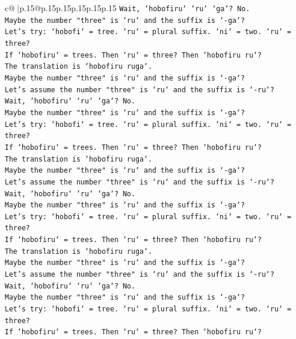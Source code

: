 \documentclass{article}
\begin{document}
{\begin{supertabular}{c@{$\;$}|p{.15\linewidth}@{}p{.15\linewidth}p{.15\linewidth}p{.15\linewidth}p{.15\linewidth}p{.15\linewidth}}
{{{\texttt{Wait, `hobofiru` `ru` `ga`? No.} \\
\texttt{Maybe the number "three" is `ru` and the suffix is `{-}ga`?} \\
\texttt{Let's try: `hobofi` = tree. `ru` = plural suffix. `ni` = two. `ru` = three?} \\
\texttt{If `hobofiru` = trees. Then `ru` = three? Then `hobofiru ru`?} \\
\texttt{The translation is `hobofiru ruga`.} \\
\texttt{Maybe the number "three" is `ru` and the suffix is `{-}ga`?} \\
\texttt{Let's assume the number "three" is `ru` and the suffix is `{-}ru`?} \\
\texttt{Wait, `hobofiru` `ru` `ga`? No.} \\
\texttt{Maybe the number "three" is `ru` and the suffix is `{-}ga`?} \\
\texttt{Let's try: `hobofi` = tree. `ru` = plural suffix. `ni` = two. `ru` = three?} \\
\texttt{If `hobofiru` = trees. Then `ru` = three? Then `hobofiru ru`?} \\
\texttt{The translation is `hobofiru ruga`.} \\
\texttt{Maybe the number "three" is `ru` and the suffix is `{-}ga`?} \\
\texttt{Let's assume the number "three" is `ru` and the suffix is `{-}ru`?} \\
\texttt{Wait, `hobofiru` `ru` `ga`? No.} \\
\texttt{Maybe the number "three" is `ru` and the suffix is `{-}ga`?} \\
\texttt{Let's try: `hobofi` = tree. `ru` = plural suffix. `ni` = two. `ru` = three?} \\
\texttt{If `hobofiru` = trees. Then `ru` = three? Then `hobofiru ru`?} \\
\texttt{The translation is `hobofiru ruga`.} \\
\texttt{Maybe the number "three" is `ru` and the suffix is `{-}ga`?} \\
\texttt{Let's assume the number "three" is `ru` and the suffix is `{-}ru`?} \\
\texttt{Wait, `hobofiru` `ru` `ga`? No.} \\
\texttt{Maybe the number "three" is `ru` and the suffix is `{-}ga`?} \\
\texttt{Let's try: `hobofi` = tree. `ru` = plural suffix. `ni` = two. `ru` = three?} \\
\texttt{If `hobofiru` = trees. Then `ru` = three? Then `hobofiru ru`?} \\
}}}
\end{supertabular}}
\end{document}
